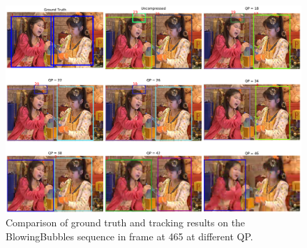 \begin{figure}[!tb]
  \centering
  \includegraphics[width=1.0\linewidth]{img/BlowingBubbles_0_frame465.pdf}
  \caption[Comparison of ground truth and tracking results on the BlowingBubbles sequence in frame 465 at different QP]
  {
  Comparison of ground truth and tracking results on the BlowingBubbles sequence in frame at 465 at different QP.
  }
  \label{fig:BlowingBubbles_0_frame465}
\end{figure}